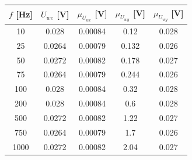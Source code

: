 \documentclass[10pt,a4paper]{article}
\begin{document}
\begin{table}[htp!]
\begin{center}
\begin{tabular}{|c|c|c|c|c|}
\hline
\multicolumn{1}{|l|}{$f$ {[}Hz{]}} & \multicolumn{1}{l|}{$U_{we}$ {[}V{]}} & \multicolumn{1}{l|}{$\mu_{U_{we}}$ {[}V{]}} & \multicolumn{1}{l|}{$\mu_{U_{wy}}$ {[}V{]}} & \multicolumn{1}{l|}{$\mu_{U_{wy}}$ {[}V{]}} \\ \hline
10                                 & 0.028                                 & 0.00084                                     & 0.12                                        & 0.028                                       \\
25                                 & 0.0264                                & 0.00079                                     & 0.132                                       & 0.026                                       \\
50                                 & 0.0272                                & 0.00082                                     & 0.178                                       & 0.027                                       \\
75                                 & 0.0264                                & 0.00079                                     & 0.244                                       & 0.026                                       \\
100                                & 0.028                                 & 0.00084                                     & 0.32                                        & 0.028                                       \\
200                                & 0.028                                 & 0.00084                                     & 0.6                                         & 0.028                                       \\
500                                & 0.0272                                & 0.00082                                     & 1.22                                        & 0.027                                       \\
750                                & 0.0264                                & 0.00079                                     & 1.7                                         & 0.026                                       \\
1000                               & 0.0272                                & 0.00082                                     & 2.04                                        & 0.027                                       \\

\end{tabular}
\end{center}
\end{table}
\end{document}
